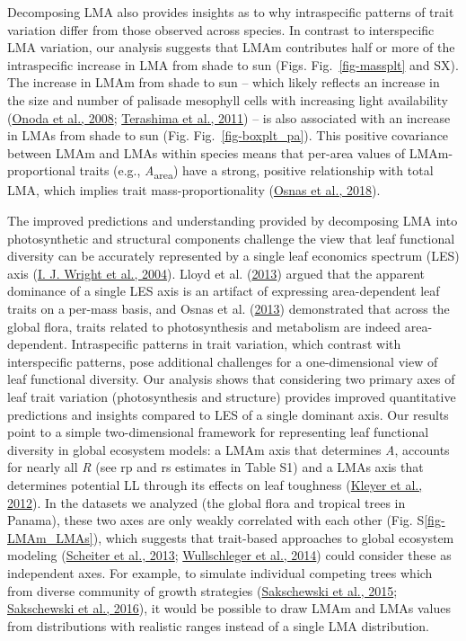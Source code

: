 \documentclass[
  12pt,
  a4paper,
,tablecaptionabove
]{scrartcl}
\begin{document}
Decomposing LMA also provides insights as to why intraspecific patterns
of trait variation differ from those observed across species. In
contrast to interspecific LMA variation, our analysis suggests that LMAm
contributes half or more of the intraspecific increase in LMA from shade
to sun (Figs. Fig.~\ref{fig-massplt} and SX). The increase in LMAm from
shade to sun -- which likely reflects an increase in the size and number
of palisade mesophyll cells with increasing light availability
(\protect\hyperlink{ref-Onoda2008}{Onoda et al., 2008};
\protect\hyperlink{ref-Terashima2011}{Terashima et al., 2011}) -- is
also associated with an increase in LMAs from shade to sun (Fig.
Fig.~\ref{fig-boxplt_pa}). This positive covariance between LMAm and
LMAs within species means that per-area values of LMAm-proportional
traits (e.g., \emph{A}\textsubscript{area}) have a strong, positive
relationship with total LMA, which implies trait mass-proportionality
(\protect\hyperlink{ref-Osnas2018}{Osnas et al., 2018}).

The improved predictions and understanding provided by decomposing LMA
into photosynthetic and structural components challenge the view that
leaf functional diversity can be accurately represented by a single leaf
economics spectrum (LES) axis (\protect\hyperlink{ref-Wright2004a}{I. J.
Wright et al., 2004}). Lloyd et al.
(\protect\hyperlink{ref-Lloyd2013}{2013}) argued that the apparent
dominance of a single LES axis is an artifact of expressing
area-dependent leaf traits on a per-mass basis, and Osnas et al.
(\protect\hyperlink{ref-Osnas2013}{2013}) demonstrated that across the
global flora, traits related to photosynthesis and metabolism are indeed
area-dependent. Intraspecific patterns in trait variation, which
contrast with interspecific patterns, pose additional challenges for a
one-dimensional view of leaf functional diversity. Our analysis shows
that considering two primary axes of leaf trait variation
(photosynthesis and structure) provides improved quantitative
predictions and insights compared to LES of a single dominant axis. Our
results point to a simple two-dimensional framework for representing
leaf functional diversity in global ecosystem models: a LMAm axis that
determines \emph{A}, accounts for nearly all \emph{R} (see rp and rs
estimates in Table S1) and a LMAs axis that determines potential LL
through its effects on leaf toughness
(\protect\hyperlink{ref-Kleyer2012}{Kleyer et al., 2012}). In the
datasets we analyzed (the global flora and tropical trees in Panama),
these two axes are only weakly correlated with each other (Fig.
S\ref{fig-LMAm_LMAs}), which suggests that trait-based approaches to
global ecosystem modeling (\protect\hyperlink{ref-Scheiter2013}{Scheiter
et al., 2013}; \protect\hyperlink{ref-Wullschleger2014}{Wullschleger et
al., 2014}) could consider these as independent axes. For example, to
simulate individual competing trees which from diverse community of
growth strategies (\protect\hyperlink{ref-Sakschewski2015}{Sakschewski
et al., 2015}; \protect\hyperlink{ref-Sakschewski2016}{Sakschewski et
al., 2016}), it would be possible to draw LMAm and LMAs values from
distributions with realistic ranges instead of a single LMA
distribution.
\end{document}
